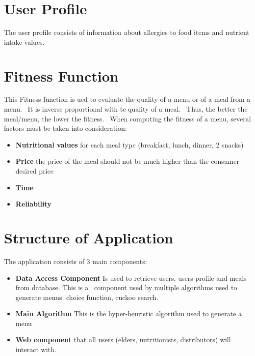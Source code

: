 \section{User Profile}
\label{sec:analysis-user-profile}
The user profile consists of information about allergies to food items and nutrient intake values.

\section{Fitness Function}
\label{sec:analysis-fitness}
This Fitness function is ued to evaluate the quality of a menu or of a meal from a menu. \
It is inverse proportional with te quality of a meal. \
Thus, the better the meal/menu, the lower the fitness. \
When computing the fitness of a menu, several factors must be taken into consideration:
\begin{itemize}
    \item \textbf{Nutritional values} for each meal type (breakfast, lunch, dinner, 2 snacks)
    \item \textbf{Price} the price of the meal should not be much higher than the consumer desired price
    \item \textbf{Time}
    \item \textbf{Reliability}

\end{itemize}

\section{Structure of Application}
\label{sec:analysis-structure}
The application consists of 3 main components:
\begin{itemize}
    \item \textbf{Data Access Component} Is used to retrieve users, users profile and meals from database. This is a \
            component used by multiple algorithms used to generate menus: choice function, cuckoo search.
    \item \textbf{Main Algorithm} This is the hyper-heuristic algorithm used to generate a menu
    \item \textbf{Web component} that all users (elders, nutritionists, distributors) will interact with.
\end{itemize}
